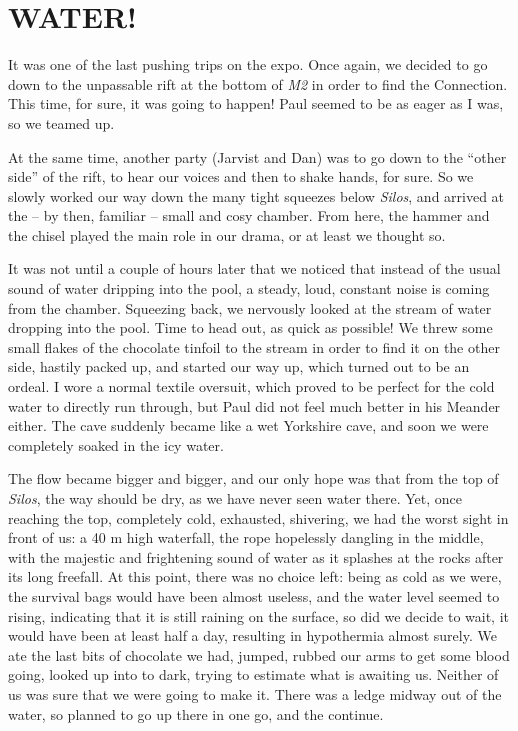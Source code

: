 \hypertarget{water}{%
\section{WATER!}\label{water}}

It was one of the last pushing trips on the expo. Once again, we decided
to go down to the unpassable rift at the bottom of \emph{M2} in order to
find the Connection. This time, for sure, it was going to happen! Paul
seemed to be as eager as I was, so we teamed up.

At the same time, another party (Jarvist and Dan) was to go down to the
``other side'' of the rift, to hear our voices and then to shake hands,
for sure. So we slowly worked our way down the many tight squeezes below
\emph{Silos}, and arrived at the -- by then, familiar -- small and cosy
chamber. From here, the hammer and the chisel played the main role in
our drama, or at least we thought so.

It was not until a couple of hours later that we noticed that instead of
the usual sound of water dripping into the pool, a steady, loud,
constant noise is coming from the chamber. Squeezing back, we nervously
looked at the stream of water dropping into the pool. Time to head out,
as quick as possible! We threw some small flakes of the chocolate
tinfoil to the stream in order to find it on the other side, hastily
packed up, and started our way up, which turned out to be an ordeal. I
wore a normal textile oversuit, which proved to be perfect for the cold
water to directly run through, but Paul did not feel much better in his
Meander either. The cave suddenly became like a wet Yorkshire cave, and
soon we were completely soaked in the icy water.

The flow became bigger and bigger, and our only hope was that from the
top of \emph{Silos}, the way should be dry, as we have never seen water
there. Yet, once reaching the top, completely cold, exhausted,
shivering, we had the worst sight in front of us: a 40 m high waterfall,
the rope hopelessly dangling in the middle, with the majestic and
frightening sound of water as it splashes at the rocks after its long
freefall. At this point, there was no choice left: being as cold as we
were, the survival bags would have been almost useless, and the water
level seemed to rising, indicating that it is still raining on the
surface, so did we decide to wait, it would have been at least half a
day, resulting in hypothermia almost surely. We ate the last bits of
chocolate we had, jumped, rubbed our arms to get some blood going,
looked up into to dark, trying to estimate what is awaiting us. Neither
of us was sure that we were going to make it. There was a ledge midway
out of the water, so planned to go up there in one go, and the continue.


